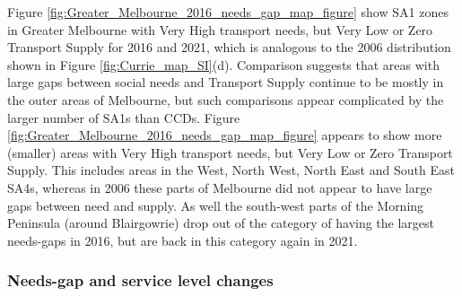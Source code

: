 \documentclass[preprint, 3p,
authoryear]{elsarticle} %
\begin{document}
Figure \ref{fig:Greater_Melbourne_2016_needs_gap_map_figure} show SA1
zones in Greater Melbourne with Very High transport needs, but Very Low
or Zero Transport Supply for 2016 and 2021, which is analogous to the
2006 distribution shown in Figure \ref{fig:Currie_map_SI}(d). Comparison
suggests that areas with large gaps between social needs and Transport
Supply continue to be mostly in the outer areas of Melbourne, but such
comparisons appear complicated by the larger number of SA1s than CCDs.
Figure \ref{fig:Greater_Melbourne_2016_needs_gap_map_figure} appears to
show more (smaller) areas with Very High transport needs, but Very Low
or Zero Transport Supply. This includes areas in the West, North West,
North East and South East SA4s, whereas in 2006 these parts of Melbourne
did not appear to have large gaps between need and supply. As well the
south-west parts of the Morning Peninsula (around Blairgowrie) drop out
of the category of having the largest needs-gaps in 2016, but are back
in this category again in 2021.

\subsubsection{Needs-gap and service level
changes}\label{needs-gap-and-service-level-changes}
\end{document}
